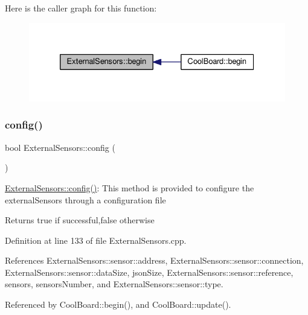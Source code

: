 Here is the caller graph for this function\+:\nopagebreak
\begin{figure}[H]
\begin{center}
\leavevmode
\includegraphics[width=326pt]{classExternalSensors_a58ede0d786a86417254708870f04a21e_icgraph}
\end{center}
\end{figure}
\mbox{\label{classExternalSensors_a862a4bd11346b37270d0244c2adabe5a}} 
\subsubsection{\texorpdfstring{config()}{config()}}
{\footnotesize\ttfamily bool External\+Sensors\+::config (\begin{DoxyParamCaption}{ }\end{DoxyParamCaption})}

\hyperlink{classExternalSensors_a862a4bd11346b37270d0244c2adabe5a}{External\+Sensors\+::config()}\+: This method is provided to configure the external\+Sensors through a configuration file

\begin{DoxyReturn}{Returns}
true if successful,false otherwise 
\end{DoxyReturn}


Definition at line 133 of file External\+Sensors.\+cpp.



References External\+Sensors\+::sensor\+::address, External\+Sensors\+::sensor\+::connection, External\+Sensors\+::sensor\+::data\+Size, json\+Size, External\+Sensors\+::sensor\+::reference, sensors, sensors\+Number, and External\+Sensors\+::sensor\+::type.



Referenced by Cool\+Board\+::begin(), and Cool\+Board\+::update().



